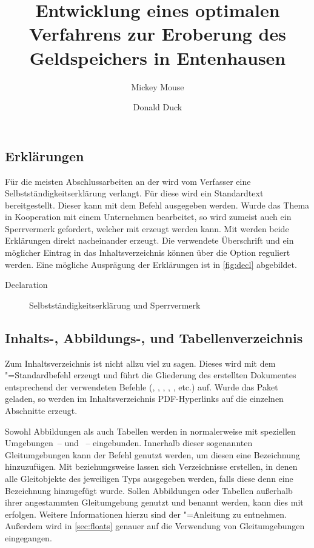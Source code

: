 \documentclass[%
  english,ngerman,%
  geometry=no,DIV=12,automark,%
]{tudscrartcl}
\begin{document}
\subsection{Erklärungen}
Für die meisten Abschlussarbeiten an der \TnUD wird vom Verfasser eine 
Selbstständigkeitserklärung verlangt. Für diese wird ein Standardtext 
bereitgestellt. Dieser kann mit dem Befehl  ausgegeben 
werden. Wurde das Thema in Kooperation mit einem Unternehmen bearbeitet, so 
wird zumeist auch ein Sperrvermerk gefordert, welcher mit  
erzeugt werden kann. Mit  werden beide Erklärungen direkt 
nacheinander erzeugt. Die verwendete Überschrift und ein möglicher Eintrag in 
das Inhaltsverzeichnis können über die Option  reguliert 
werden. Eine mögliche Ausprägung der Erklärungen ist in \autoref{fig:decl} 
abgebildet.
%
\begin{Tutorial!}{Declaration}
\title{%
  Entwicklung eines optimalen Verfahrens zur Eroberung des
  Geldspeichers in Entenhausen
}
\author{Mickey Mouse\and Donald Duck}
\declaration[company=FIRMA]
\end{Tutorial!}
%
\begin{figure}
\centering
{}
\caption{Selbstständigkeitserklärung und Sperrvermerk}
\label{fig:decl}
\end{figure}


\subsection{Inhalts-, Abbildungs-, und Tabellenverzeichnis}
Zum Inhaltsverzeichnis ist nicht allzu viel zu sagen. Dieses wird mit dem
"=Standardbefehl  erzeugt und führt die 
Gliederung des erstellten Dokumentes entsprechend der verwendeten Befehle 
(, , , , 
,  etc.) auf. Wurde das Paket  
geladen, so werden im Inhaltsverzeichnis PDF-Hyperlinks auf die einzelnen 
Abschnitte erzeugt.

Sowohl Abbildungen als auch Tabellen werden in  normalerweise mit 
speziellen Umgebungen~--  und ~-- 
eingebunden. Innerhalb dieser sogenannten Gleitumgebungen kann der Befehl 
 genutzt 
werden, um diesen eine Bezeichnung hinzuzufügen. Mit  
beziehungsweise  lassen sich Verzeichnisse erstellen, in 
denen alle Gleitobjekte des jeweiligen Typs ausgegeben werden, falls diese denn 
eine Bezeichnung hinzugefügt wurde. Sollen Abbildungen oder Tabellen außerhalb 
ihrer angestammten Gleitumgebung genutzt und benannt werden, kann dies mit
erfolgen. Weitere Informationen hierzu sind der \KOMAScript"=Anleitung 
\scrguide zu entnehmen. Außerdem wird in \autoref{sec:floats} genauer auf die 
Verwendung von Gleitumgebungen eingegangen.
%
\begin{Tutorial*}
\tableofcontents
\listoffigures
\listoftables
\clearpage
\end{Tutorial*}
\end{document}
